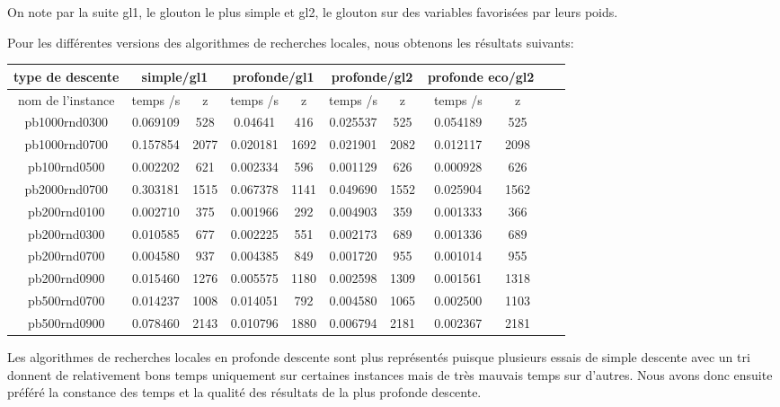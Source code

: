 On note par la suite gl1, le glouton le plus simple et gl2, le glouton sur des variables favorisées par leurs poids.

Pour les différentes versions des algorithmes de recherches locales, nous obtenons les résultats suivants:
\begin{center}
    \begin{tabular}{|c|c|c|c|c|c|c|c|c|c|c|}

    \hline
    type de descente & \multicolumn{2}{c|}{simple/gl1} &
    \multicolumn{2}{c|}{profonde/gl1} &
    \multicolumn{2}{c|}{profonde/gl2} &
    \multicolumn{2}{c|}{profonde eco/gl2}\\
    
    \hline
    nom de l'instance  & temps /s  & z & temps /s & z & temps /s & z & temps /s & z \\
     \hline
     pb1000rnd0300 & 0.069109 & 528 & 0.04641 & 416 & 0.025537 & 525 & 0.054189 & 525\\
     \hline
     pb1000rnd0700 & 0.157854 & 2077 & 0.020181 & 1692 & 0.021901 & 2082 & 0.012117 & 2098\\
     \hline
     pb100rnd0500 & 0.002202 & 621 & 0.002334 & 596 & 0.001129 & 626 & 0.000928 & 626\\
     \hline
     pb2000rnd0700 & 0.303181 & 1515 & 0.067378 & 1141 & 0.049690 & 1552 & 0.025904 & 1562\\
     \hline
     pb200rnd0100 & 0.002710 & 375 & 0.001966 & 292 & 0.004903 & 359 & 0.001333 & 366\\
     \hline 
     pb200rnd0300 & 0.010585 & 677 & 0.002225 & 551 & 0.002173 & 689 & 0.001336 & 689\\
     \hline
     pb200rnd0700 & 0.004580 & 937 & 0.004385 & 849 & 0.001720 & 955 & 0.001014 & 955\\
     \hline
     pb200rnd0900 & 0.015460 & 1276 & 0.005575 & 1180 & 0.002598 & 1309 & 0.001561 & 1318\\
     \hline 
     pb500rnd0700 & 0.014237 & 1008 & 0.014051 & 792 & 0.004580 & 1065 & 0.002500 & 1103\\
     \hline 
     pb500rnd0900 & 0.078460 & 2143 & 0.010796 & 1880 & 0.006794 & 2181 & 0.002367 & 2181\\
     \hline
    \end{tabular}
\end{center}


Les algorithmes de recherches locales en profonde descente sont plus représentés puisque plusieurs essais de simple descente avec un tri donnent de relativement bons temps uniquement sur certaines instances mais de très mauvais temps sur d'autres. Nous avons donc ensuite préféré la constance des temps et la qualité des résultats de la plus profonde descente.


